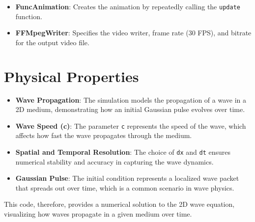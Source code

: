 \documentclass{article}
\begin{document}
\begin{itemize}
    \item \textbf{FuncAnimation}: Creates the animation by repeatedly calling the \texttt{update} function.
    \item \textbf{FFMpegWriter}: Specifies the video writer, frame rate (30 FPS), and bitrate for the output video file.
\end{itemize}

\section{Physical Properties}

\begin{itemize}
    \item \textbf{Wave Propagation}: The simulation models the propagation of a wave in a 2D medium, demonstrating how an initial Gaussian pulse evolves over time.
    \item \textbf{Wave Speed (c)}: The parameter \texttt{c} represents the speed of the wave, which affects how fast the wave propagates through the medium.
    \item \textbf{Spatial and Temporal Resolution}: The choice of \texttt{dx} and \texttt{dt} ensures numerical stability and accuracy in capturing the wave dynamics.
    \item \textbf{Gaussian Pulse}: The initial condition represents a localized wave packet that spreads out over time, which is a common scenario in wave physics.
\end{itemize}

This code, therefore, provides a numerical solution to the 2D wave equation, visualizing how waves propagate in a given medium over time.
\end{document}
